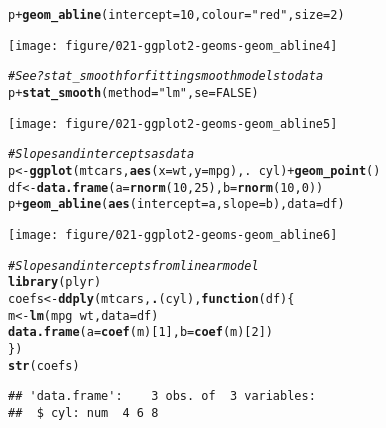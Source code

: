 \documentclass[a4paper,titlepage]{tufte-handout}\usepackage[]{graphicx}\usepackage[]{color}
\makeatletter
\def\maxwidth{ %
  \ifdim\Gin@nat@width>\linewidth
    \linewidth
  \else
    \Gin@nat@width
  \fi
}
\newcommand{\hlnum}[1]{\textcolor[rgb]{0.686,0.059,0.569}{#1}}%
\newcommand{\hlstr}[1]{\textcolor[rgb]{0.192,0.494,0.8}{#1}}%
\newcommand{\hlcom}[1]{\textcolor[rgb]{0.678,0.584,0.686}{\textit{#1}}}%
\newcommand{\hlopt}[1]{\textcolor[rgb]{0,0,0}{#1}}%
\newcommand{\hlstd}[1]{\textcolor[rgb]{0.345,0.345,0.345}{#1}}%
\newcommand{\hlkwa}[1]{\textcolor[rgb]{0.161,0.373,0.58}{\textbf{#1}}}%
\newcommand{\hlkwb}[1]{\textcolor[rgb]{0.69,0.353,0.396}{#1}}%
\newcommand{\hlkwc}[1]{\textcolor[rgb]{0.333,0.667,0.333}{#1}}%
\newcommand{\hlkwd}[1]{\textcolor[rgb]{0.737,0.353,0.396}{\textbf{#1}}}%
\newenvironment{kframe}{%
 \def\at@end@of@kframe{}%
 \ifinner\ifhmode%
  \def\at@end@of@kframe{\end{minipage}}%
  \begin{minipage}{\columnwidth}%
 \fi\fi%
 \def\FrameCommand##1{\hskip\@totalleftmargin \hskip-\fboxsep
 \colorbox{shadecolor}{##1}\hskip-\fboxsep
     \hskip-\linewidth \hskip-\@totalleftmargin \hskip\columnwidth}%
 \MakeFramed {\advance\hsize-\width
   \@totalleftmargin\z@ \linewidth\hsize
   \@setminipage}}%
 {\par\unskip\endMakeFramed%
 \at@end@of@kframe}
\newenvironment{knitrout}{}{} %
\makeatother
\begin{document}
\begin{knitrout}
\begin{kframe}\begin{alltt}
\hlstd{p} \hlopt{+} \hlkwd{geom_abline}\hlstd{(}\hlkwc{intercept} \hlstd{=} \hlnum{10}\hlstd{,} \hlkwc{colour} \hlstd{=} \hlstr{"red"}\hlstd{,} \hlkwc{size} \hlstd{=} \hlnum{2}\hlstd{)}
\end{alltt}
\end{kframe}
\texttt{[image: figure/021-ggplot2-geoms-geom\_abline4]} 
\begin{kframe}\begin{alltt}
\hlcom{# See ?stat_smooth for fitting smooth models to data}
\hlstd{p} \hlopt{+} \hlkwd{stat_smooth}\hlstd{(}\hlkwc{method}\hlstd{=}\hlstr{"lm"}\hlstd{,} \hlkwc{se}\hlstd{=}\hlnum{FALSE}\hlstd{)}
\end{alltt}
\end{kframe}
\texttt{[image: figure/021-ggplot2-geoms-geom\_abline5]} 
\begin{kframe}\begin{alltt}
\hlcom{# Slopes and intercepts as data}
\hlstd{p} \hlkwb{<-} \hlkwd{ggplot}\hlstd{(mtcars,} \hlkwd{aes}\hlstd{(}\hlkwc{x} \hlstd{= wt,} \hlkwc{y}\hlstd{=mpg), .} \hlopt{~} \hlstd{cyl)} \hlopt{+} \hlkwd{geom_point}\hlstd{()}
\hlstd{df} \hlkwb{<-} \hlkwd{data.frame}\hlstd{(}\hlkwc{a}\hlstd{=}\hlkwd{rnorm}\hlstd{(}\hlnum{10}\hlstd{,} \hlnum{25}\hlstd{),} \hlkwc{b}\hlstd{=}\hlkwd{rnorm}\hlstd{(}\hlnum{10}\hlstd{,} \hlnum{0}\hlstd{))}
\hlstd{p} \hlopt{+} \hlkwd{geom_abline}\hlstd{(}\hlkwd{aes}\hlstd{(}\hlkwc{intercept}\hlstd{=a,} \hlkwc{slope}\hlstd{=b),} \hlkwc{data}\hlstd{=df)}
\end{alltt}
\end{kframe}
\texttt{[image: figure/021-ggplot2-geoms-geom\_abline6]} 
\begin{kframe}\begin{alltt}
\hlcom{# Slopes and intercepts from linear model}
\hlkwd{library}\hlstd{(plyr)}
\hlstd{coefs} \hlkwb{<-} \hlkwd{ddply}\hlstd{(mtcars,} \hlkwd{.}\hlstd{(cyl),} \hlkwa{function}\hlstd{(}\hlkwc{df}\hlstd{) \{}
  \hlstd{m} \hlkwb{<-} \hlkwd{lm}\hlstd{(mpg} \hlopt{~} \hlstd{wt,} \hlkwc{data}\hlstd{=df)}
  \hlkwd{data.frame}\hlstd{(}\hlkwc{a} \hlstd{=} \hlkwd{coef}\hlstd{(m)[}\hlnum{1}\hlstd{],} \hlkwc{b} \hlstd{=} \hlkwd{coef}\hlstd{(m)[}\hlnum{2}\hlstd{])}
\hlstd{\})}
\hlkwd{str}\hlstd{(coefs)}
\end{alltt}
\begin{verbatim}
## 'data.frame':	3 obs. of  3 variables:
##  $ cyl: num  4 6 8

\end{verbatim}
\end{kframe}
\end{knitrout}
\end{document}

